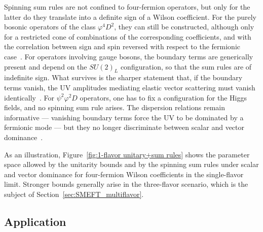 Spinning sum rules are not confined to four-fermion operators, but only for the latter do they
translate into a definite sign of a Wilson coefficient. For the purely bosonic operators of the class
$\varphi^4 D^2$, they can still be constructed, although only for a restricted cone of combinations of the
corresponding coefficients, and with the correlation between sign and spin reversed with respect to
the fermionic case~\cite{Remmen:2022orj}. For operators involving gauge bosons, the boundary terms are
generically present and depend on the $SU(2)_L$ configuration, so that the sum rules are of
indefinite sign. What survives is the sharper statement that, if the boundary terms vanish, the UV
amplitudes mediating elastic vector scattering must vanish identically~\cite{Remmen:2022orj}. For
$\psi^2\varphi^2D$ operators, one has to fix a configuration for the Higgs fields, and no spinning sum
rule arises. The dispersion relations remain informative --- vanishing boundary terms force the UV to
be dominated by a fermionic mode --- but they no longer discriminate between scalar and vector
dominance~\cite{Remmen:2022orj}.


As an illustration, Figure~\ref{fig:1-flavor unitary+sum rules} shows the parameter space allowed by
the unitarity bounds and by the spinning sum rules under scalar and vector dominance for four-fermion
Wilson coefficients in the single-flavor limit. Stronger bounds generally arise in the three-flavor
scenario, which is the subject of Section~\ref{sec:SMEFT_multiflavor}.

\subsection{Application}

